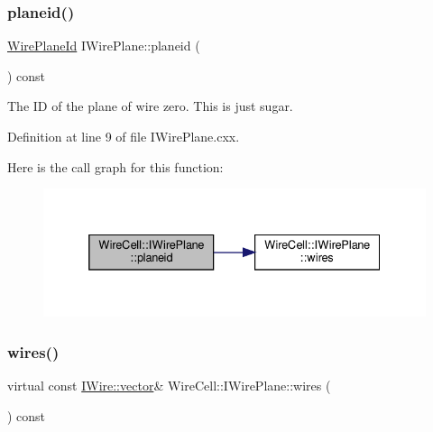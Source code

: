 \mbox{\label{class_wire_cell_1_1_i_wire_plane_af43d2d7b981ab0eb4c5a4cc458f7bb1e}} 
\subsubsection{\texorpdfstring{planeid()}{planeid()}}
{\footnotesize\ttfamily \hyperlink{class_wire_cell_1_1_wire_plane_id}{Wire\+Plane\+Id} I\+Wire\+Plane\+::planeid (\begin{DoxyParamCaption}{ }\end{DoxyParamCaption}) const\hspace{0.3cm}{\ttfamily [virtual]}}



The ID of the plane of wire zero. This is just sugar. 



Definition at line 9 of file I\+Wire\+Plane.\+cxx.

Here is the call graph for this function\+:
\nopagebreak
\begin{figure}[H]
\begin{center}
\leavevmode
\includegraphics[width=332pt]{class_wire_cell_1_1_i_wire_plane_af43d2d7b981ab0eb4c5a4cc458f7bb1e_cgraph}
\end{center}
\end{figure}
\mbox{\label{class_wire_cell_1_1_i_wire_plane_ad5f6668d7faefcd895daf602dc60be1a}} 
\subsubsection{\texorpdfstring{wires()}{wires()}}
{\footnotesize\ttfamily virtual const \hyperlink{class_wire_cell_1_1_i_data_ae1a9f863380499bb43f39fabb6276660}{I\+Wire\+::vector}\& Wire\+Cell\+::\+I\+Wire\+Plane\+::wires (\begin{DoxyParamCaption}{ }\end{DoxyParamCaption}) const\hspace{0.3cm}{\ttfamily [pure virtual]}}



